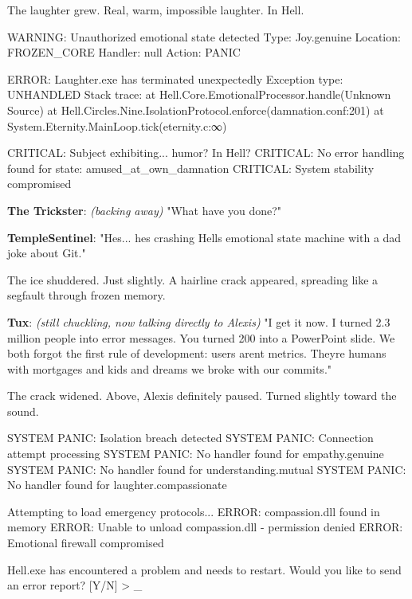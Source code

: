 The laughter grew. Real, warm, impossible laughter. In Hell.

\begin{codeblock}
WARNING: Unauthorized emotional state detected
Type: Joy.genuine
Location: FROZEN_CORE
Handler: null
Action: PANIC

ERROR: Laughter.exe has terminated unexpectedly
Exception type: UNHANDLED
Stack trace: 
  at Hell.Core.EmotionalProcessor.handle(Unknown Source)
  at Hell.Circles.Nine.IsolationProtocol.enforce(damnation.conf:201)
  at System.Eternity.MainLoop.tick(eternity.c:∞)

CRITICAL: Subject exhibiting... humor? In Hell?
CRITICAL: No error handling found for state: amused_at_own_damnation
CRITICAL: System stability compromised
\end{codeblock}

\textbf{The Trickster}: \emph{(backing away)} "What have you done?"

\textbf{TempleSentinel}: "He\textquotesingle s... he\textquotesingle s crashing Hell\textquotesingle s emotional state machine with a dad joke about Git."

The ice shuddered. Just slightly. A hairline crack appeared, spreading like a segfault through frozen memory.

\textbf{Tux}: \emph{(still chuckling, now talking directly to Alexis)} "I get it now. I turned 2.3 million people into error messages. You turned 200 into a PowerPoint slide. We both forgot the first rule of development: users aren\textquotesingle t metrics. They\textquotesingle re humans with mortgages and kids and dreams we broke with our commits."

The crack widened. Above, Alexis definitely paused. Turned slightly toward the sound.

\begin{codeblock}
SYSTEM PANIC: Isolation breach detected
SYSTEM PANIC: Connection attempt processing
SYSTEM PANIC: No handler found for empathy.genuine
SYSTEM PANIC: No handler found for understanding.mutual
SYSTEM PANIC: No handler found for laughter.compassionate

Attempting to load emergency protocols...
ERROR: compassion.dll found in memory
ERROR: Unable to unload compassion.dll - permission denied
ERROR: Emotional firewall compromised

Hell.exe has encountered a problem and needs to restart.
Would you like to send an error report? [Y/N]
> _
\end{codeblock}

